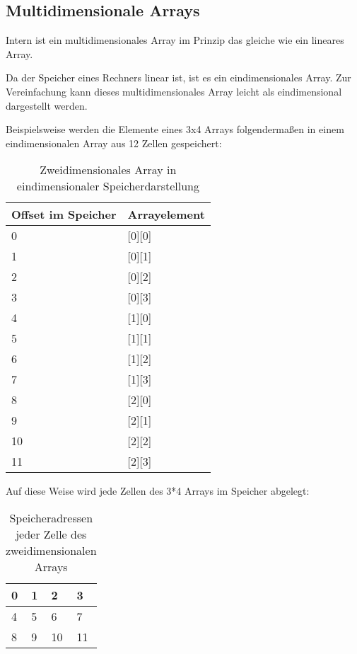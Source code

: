 \subsection{Multidimensionale Arrays}
Intern ist ein multidimensionales Array im Prinzip das gleiche wie ein lineares Array.

Da der Speicher eines Rechners linear ist, ist es ein eindimensionales Array.
Zur Vereinfachung kann dieses multidimensionales Array leicht als eindimensional dargestellt werden.

Beispielsweise werden die Elemente eines 3x4 Arrays folgendermaßen in einem eindimensionalen Array aus 12 Zellen
gespeichert:

\begin{table}[H]
\centering
\begin{tabular}{ | l | l | }
\hline
Offset im Speicher & Arrayelement \\
\hline
0 & [0][0] \\
\hline
1 & [0][1] \\
\hline
2 & [0][2] \\
\hline
3 & [0][3] \\
\hline
4 & [1][0] \\
\hline
5 & [1][1] \\
\hline
6 & [1][2] \\
\hline
7 & [1][3] \\
\hline
8 & [2][0] \\
\hline
9 & [2][1] \\
\hline
10 & [2][2] \\
\hline
11 & [2][3] \\
\hline
\end{tabular}
\caption{Zweidimensionales Array in eindimensionaler Speicherdarstellung}
\end{table}

Auf diese Weise wird jede Zellen des 3*4 Arrays im Speicher abgelegt:

\begin{table}[H]
\centering
\begin{tabular}{ | l | l | l | l | }
\hline                        
0 & 1 & 2 & 3 \\
\hline  
4 & 5 & 6 & 7 \\
\hline  
8 & 9 & 10 & 11 \\
\hline  
\end{tabular}
\caption{Speicheradressen jeder Zelle des zweidimensionalen Arrays}
\end{table}


